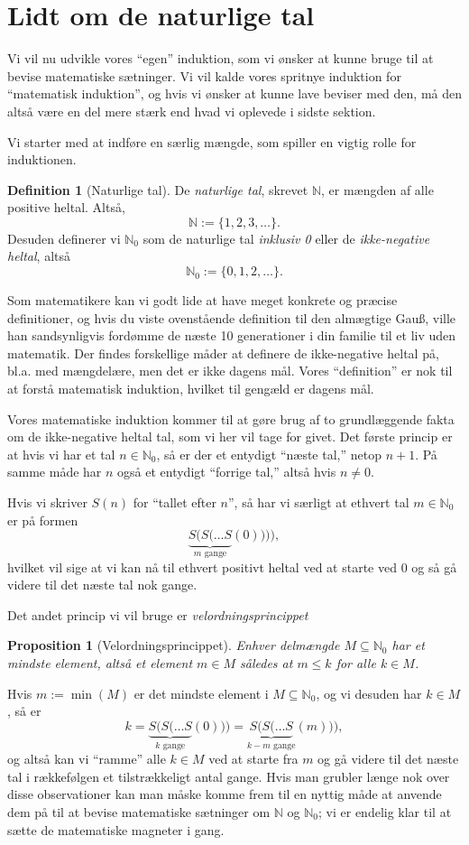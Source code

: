 \documentclass[a4paper, 12pt]{article}
\numberwithin{equation}{section}
\theoremstyle{plain}
\newtheorem{proposition}[saetning]{Proposition}
\theoremstyle{definition}
\newtheorem{definition}[saetning]{Definition}
\newcommand{\N}{\mathbb{N}}
\begin{document}
\section{Lidt om de naturlige tal}
Vi vil nu udvikle vores ``egen'' induktion, som vi ønsker at kunne bruge til at bevise matematiske sætninger. Vi vil kalde vores spritnye induktion for ``matematisk induktion'', og hvis vi ønsker at kunne lave beviser med den, må den altså være en del mere stærk end hvad vi oplevede i sidste sektion.

Vi starter med at indføre en særlig mængde, som spiller en vigtig rolle for induktionen.
\begin{definition}[Naturlige tal]
  De \emph{naturlige tal}, skrevet \(\N\), er mængden af alle positive heltal. Altså,
  \[
    \N:=\{1,2,3,\ldots\}.
  \]
  Desuden definerer vi \(\N_0\) som de naturlige tal \emph{inklusiv 0} eller de \emph{ikke-negative heltal}, altså
  \[
    \N_0:=\{0,1,2,\ldots\}.
    \]
\end{definition}
Som matematikere kan vi godt lide at have meget konkrete og præcise definitioner, og hvis du viste ovenstående definition til den almægtige Gau{\ss}, ville han sandsynligvis fordømme de næste 10 generationer i din familie til et liv uden matematik. Der findes forskellige måder at definere de ikke-negative heltal på, bl.a. med mængdelære, men det er ikke dagens mål. Vores ``definition'' er nok til at forstå matematisk induktion, hvilket til gengæld er dagens mål.

Vores matematiske induktion kommer til at gøre brug af to grundlæggende fakta om de ikke-negative heltal tal, som vi her vil tage for givet. Det første princip er at hvis vi har et  tal \(n\in\N_0\), så er der et entydigt ``næste tal,'' netop \(n+1\). På samme måde har \(n\) også et entydigt ``forrige tal,'' altså hvis \(n\neq 0\).

Hvis vi skriver \(S(n)\) for ``tallet efter \(n\)'', så har vi særligt at ethvert tal \(m\in\N_0\) er på formen
\[
  \underbrace{S(S(\ldots S}_{m\text{ gange}}(0)))),
\]
hvilket vil sige at vi kan nå til ethvert positivt heltal ved at starte ved 0 og så gå videre til det næste tal nok gange.

Det andet princip vi vil bruge er \emph{velordningsprincippet}
\begin{proposition}[Velordningsprincippet]
  Enhver delmængde \(M\subseteq \N_0\) har et \emph{mindste element}, altså et element \(m\in M\) således at \(m\le k\) for alle \(k\in M\).
\end{proposition}
Hvis \(m:=\min(M)\) er det mindste element i \(M\subseteq \N_0\), og vi desuden har \(k\in M\), så er
\[
  k=\underbrace{S(S(\ldots S}_{k\text{ gange}}(0)))=\underbrace{S(S(\ldots S}_{k-m\text{ gange}}(m))),
  \]
  og altså kan vi ``ramme'' alle \(k\in M\) ved at starte fra \(m\) og gå videre til det næste tal i rækkefølgen et tilstrækkeligt antal gange. Hvis man grubler længe nok over disse observationer kan man måske komme frem til en nyttig måde at anvende dem på til at bevise matematiske sætninger om \(\N\) og \(\N_0\); vi er endelig klar til at sætte de matematiske magneter i gang.
\end{document}
